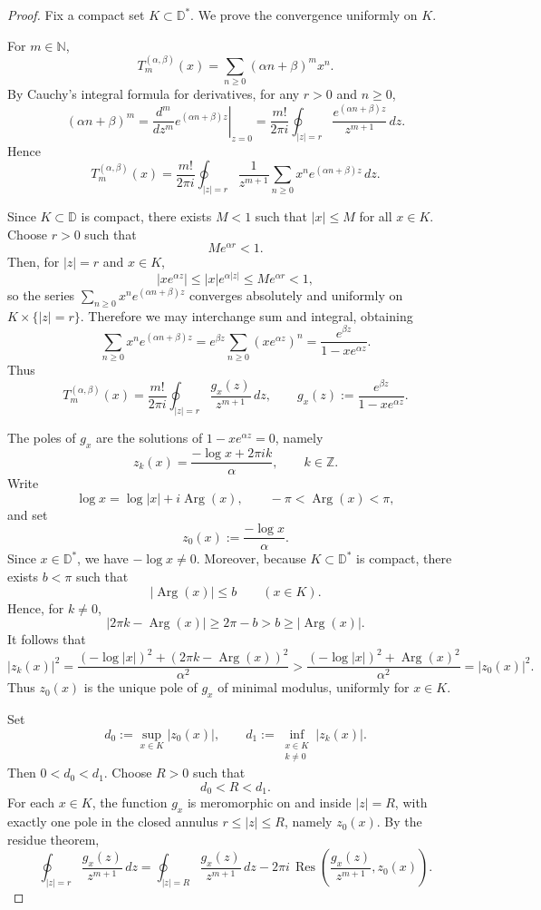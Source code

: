 \documentclass[10pt,a4paper]{amsart}
\newcommand{\Arg}{\operatorname{Arg}}
\begin{document}
\begin{proof}
Fix a compact set \(K\subset\mathbb D^\ast\). We prove the convergence uniformly on \(K\).

For \(m\in\mathbb N\),
\[
T_m^{(\alpha,\beta)}(x)=\sum_{n\ge0}(\alpha n+\beta)^m x^n.
\]
By Cauchy's integral formula for derivatives, for any \(r>0\) and \(n\ge0\),
\[
(\alpha n+\beta)^m
=
\left.\frac{d^m}{dz^m}e^{(\alpha n+\beta)z}\right|_{z=0}
=
\frac{m!}{2\pi i}\oint_{|z|=r}\frac{e^{(\alpha n+\beta)z}}{z^{m+1}}\,dz.
\]
Hence
\[
T_m^{(\alpha,\beta)}(x)
=
\frac{m!}{2\pi i}\oint_{|z|=r}\frac{1}{z^{m+1}}
\sum_{n\ge0}x^n e^{(\alpha n+\beta)z}\,dz.
\]

Since \(K\subset\mathbb D\) is compact, there exists \(M<1\) such that \(|x|\le M\) for all \(x\in K\).
Choose \(r>0\) such that
\[
Me^{\alpha r}<1.
\]
Then, for \(|z|=r\) and \(x\in K\),
\[
|x e^{\alpha z}|
\le |x|e^{\alpha|z|}
\le Me^{\alpha r}
<1,
\]
so the series \(\sum_{n\ge0}x^n e^{(\alpha n+\beta)z}\) converges absolutely and uniformly on
\(K\times\{|z|=r\}\). Therefore we may interchange sum and integral, obtaining
\[
\sum_{n\ge0}x^n e^{(\alpha n+\beta)z}
=
e^{\beta z}\sum_{n\ge0}(x e^{\alpha z})^n
=
\frac{e^{\beta z}}{1-x e^{\alpha z}}.
\]
Thus
\[
T_m^{(\alpha,\beta)}(x)
=
\frac{m!}{2\pi i}\oint_{|z|=r}\frac{g_x(z)}{z^{m+1}}\,dz,
\qquad
g_x(z):=\frac{e^{\beta z}}{1-x e^{\alpha z}}.
\]

The poles of \(g_x\) are the solutions of \(1-x e^{\alpha z}=0\), namely
\[
z_k(x)=\frac{-\log x+2\pi i k}{\alpha},
\qquad k\in\mathbb Z.
\]
Write
\[
\log x=\log|x|+i\Arg(x),
\qquad -\pi<\Arg(x)<\pi,
\]
and set
\[
z_0(x):=\frac{-\log x}{\alpha}.
\]
Since \(x\in\mathbb D^\ast\), we have \(-\log x\neq0\). Moreover, because \(K\subset\mathbb D^\ast\) is compact,
there exists \(b<\pi\) such that
\[
|\Arg(x)|\le b
\qquad (x\in K).
\]
Hence, for \(k\neq0\),
\[
|2\pi k-\Arg(x)|\ge 2\pi-b>b\ge |\Arg(x)|.
\]
It follows that
\[
|z_k(x)|^2
=
\frac{(-\log|x|)^2+(2\pi k-\Arg(x))^2}{\alpha^2}
>
\frac{(-\log|x|)^2+\Arg(x)^2}{\alpha^2}
=
|z_0(x)|^2.
\]
Thus \(z_0(x)\) is the unique pole of \(g_x\) of minimal modulus, uniformly for \(x\in K\).

Set
\[
d_0:=\sup_{x\in K}|z_0(x)|,
\qquad
d_1:=\inf_{\substack{x\in K\\ k\neq0}}|z_k(x)|.
\]
Then \(0<d_0<d_1\). Choose \(R>0\) such that
\[
d_0<R<d_1.
\]
For each \(x\in K\), the function \(g_x\) is meromorphic on and inside \(|z|=R\), with exactly one pole
in the closed annulus \(r\le |z|\le R\), namely \(z_0(x)\). By the residue theorem,
\[
\oint_{|z|=r}\frac{g_x(z)}{z^{m+1}}\,dz
=
\oint_{|z|=R}\frac{g_x(z)}{z^{m+1}}\,dz
-
2\pi i\,\operatorname{Res}\!\left(\frac{g_x(z)}{z^{m+1}},z_0(x)\right).
\]


\end{proof}
\end{document}
